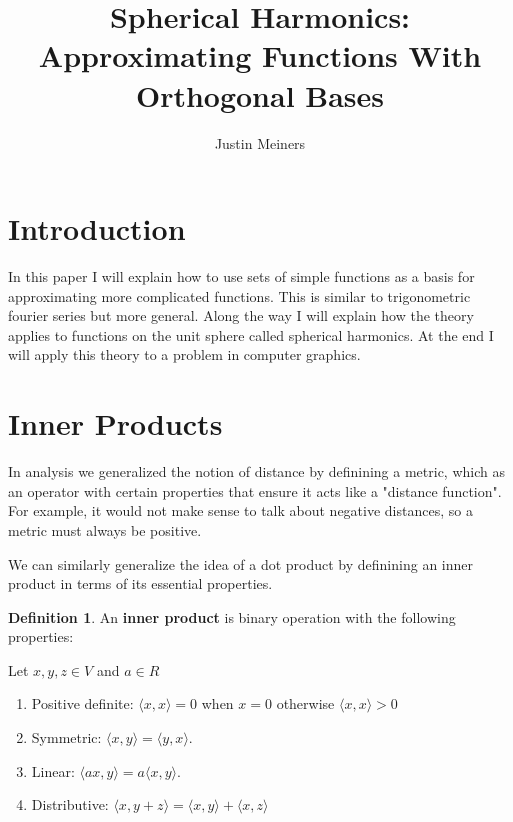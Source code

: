 \documentclass{article}
\theoremstyle{definition}
\newtheorem{definition}{Definition}
\theoremstyle{definition}
\begin{document}
\title{Spherical Harmonics: Approximating Functions With Orthogonal Bases}
\author{Justin Meiners}

\maketitle

\section{Introduction}

In this paper I will explain how to use sets of simple functions as a basis for approximating more complicated functions. This is similar to trigonometric fourier series but more general. Along the way I will explain how the theory applies to functions on the unit sphere called spherical harmonics. At the end I will apply this theory to a problem in computer graphics.

\section{Inner Products}

In analysis we generalized the notion of distance by definining a metric, which as an operator with certain properties that ensure it acts like a "distance function". For example, it would not make sense to talk about negative distances, so a metric must always be positive.

We can similarly generalize the idea of a dot product by definining an inner product in terms of its essential properties.

\begin{definition}
    An \textbf{inner product} is binary operation with the following properties:

    Let $x, y, z\in V$ and $a\in R$

    \begin{enumerate}
        \item Positive definite: $\langle x, x\rangle=0$ when $x=0$ otherwise $\langle x, x \rangle>0$
        \item Symmetric: $\langle x, y \rangle=\langle y, x \rangle$.
        \item Linear: $\langle ax, y \rangle= a\langle x, y \rangle$.
        \item Distributive: $\langle x, y + z \rangle = \langle x, y \rangle + \langle x, z \rangle$
    \end{enumerate}
\end{definition}
\end{document}

